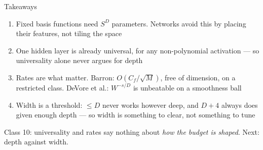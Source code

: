 \documentclass[aspectratio=169, 11pt]{beamer}
\newcommand{\nosrc}{}       %
\begin{document}
\begin{frame}{Takeaways}
  \nosrc
  \vspace{0.1em}
  {\footnotesize
  \begin{enumerate}\setlength{\itemsep}{2pt}
    \item Fixed basis functions need $S^{D}$ parameters. Networks avoid
          this by \alert{placing their features}, not tiling the space
    \item One hidden layer is already universal, for any
          non-polynomial activation --- so \alert{universality alone
          never argues for depth}
    \item Rates are what matter. \alert{Barron}: $O(C_f/\sqrt{M})$,
          free of dimension, on a restricted class.
          \alert{DeVore et al.}: $W^{-s/D}$ is unbeatable on a
          smoothness ball
    \item \alert{Width is a threshold}: $\leq D$ never works however
          deep, and $D+4$ always does given enough depth --- so width
          is something to clear, not something to tune
  \end{enumerate}}
  \vspace{-0.1em}
  \begin{redhighlight}
    {\scriptsize Class 10: universality and rates say nothing about
    \emph{how the budget is shaped}. Next: depth against width.}
  \end{redhighlight}
\end{frame}
\end{document}
